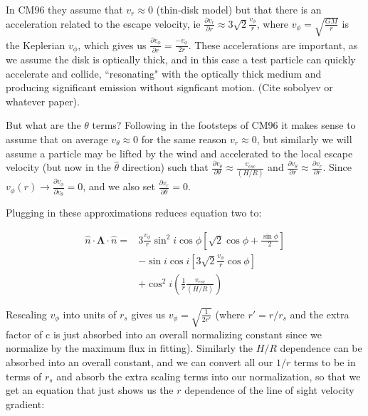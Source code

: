\documentclass[12pt, a4paper]{article}
\begin{document}
In CM96 they assume that $v_r \approx 0$ (thin-disk model) but that there is an acceleration related to the escape velocity, ie $\frac{\partial v_r}{\partial r} \approx 3\sqrt{2}\frac{v_\phi}{r}$, where $v_\phi = \sqrt{\frac{GM}{r}}$ is the Keplerian $v_\phi$, which gives us $\frac{\partial v_\phi}{\partial r} =  \frac{-v_\phi}{2r}$. These accelerations are important, as we assume the disk is optically thick, and in this case a test particle can quickly accelerate and collide, ``resonating" with the optically thick medium and producing significant emission without signficant motion. (Cite sobolyev or whatever paper).

But what are the $\theta$ terms? Following in the footsteps of CM96 it makes sense to assume that on average $v_\theta \approx 0$ for the same reason $v_r \approx 0$, but similarly we will assume a particle may be lifted by the wind and accelerated to the local escape velocity (but now in the $\hat{\theta}$ direction) such that $\frac{\partial v_\theta}{\partial \theta} \approx \frac{v_{esc}}{\left(H/R\right)}$ and $\frac{\partial v_\theta}{\partial r} \approx \frac{\partial v_r}{\partial r}$. Since $v_\phi(r) \rightarrow \frac{\partial v_\phi}{\partial v_\theta} = 0$, and we also set $\frac{\partial v_r}{\partial \theta} = 0$.

Plugging in these approximations reduces equation two to:

\begin{equation} \label{eq3}
\begin{split}
\hat{n}\cdot\boldsymbol{\Lambda}\cdot\hat{n} = & 3\frac{v_\phi}{r} \sin^2i\cos\phi\left[\sqrt{2}\cos\phi + \frac{\sin\phi}{2}\right]\\
& -\sin i \cos i \left[3\sqrt{2}\frac{v_\phi}{r}\cos\phi\right] \\
& +\cos^2i\left(\frac{1}{r}\frac{v_{esc}}{(H/R)}\right)
\end{split}
\end{equation}

Rescaling $v_\phi$ into units of $r_s$ gives us $v_\phi = \sqrt{\frac{1}{2r'}}$ (where $r' = r/r_s$ and the extra factor of c is just absorbed into an overall normalizing constant since we normalize by the maximum flux in fitting). Similarly the $H/R$ dependence can be absorbed into an overall constant, and we can convert all our $1/r$ terms to be in terms of $r_s$ and absorb the extra scaling terms into our normalization, so that we get an equation that just shows us the $r$ dependence of the line of sight velocity gradient:
\end{document}
